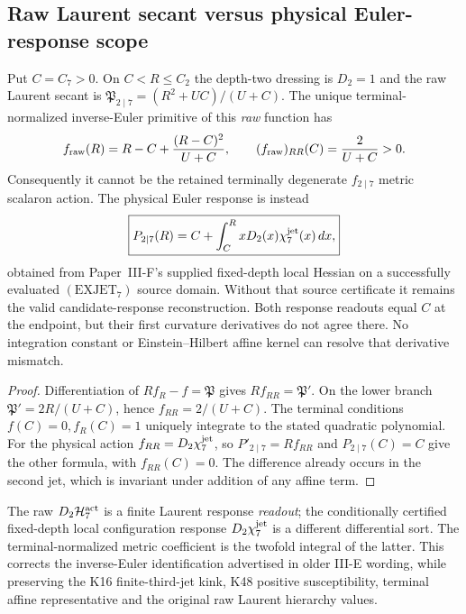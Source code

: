 \documentclass[12pt,a4paper]{article}
\begin{document}
\subsection{Raw Laurent secant versus physical Euler-response scope}
\label{p3e:sec:v1107-raw-euler-distinction}
\begin{proposition}
\label{p3e:prop:v1107-raw-not-physical-euler}
Put \(C=C_7>0\).  On \(C<R\le C_2\) the depth-two dressing is
\(D_2=1\) and the raw Laurent secant is
\(\mathfrak P_{2\mid7}=(R^2+UC)/(U+C)\).  The unique
terminal-normalized inverse-Euler primitive of this \emph{raw} function
has
\[
 f_{\rm raw}(R)=R-C+\frac{(R-C)^2}{U+C},\qquad
 (f_{\rm raw})_{RR}(C)=\frac{2}{U+C}>0.
\]
Consequently it cannot be the retained terminally degenerate
\(f_{2\mid7}\) metric scalaron action.  The physical Euler response is
instead
\[
 \boxed{P_{2\mid7}(R)=C+\int_C^R xD_2(x)\chi_7^{\rm jet}(x)\,dx,}
\]
obtained from Paper~III-F's supplied fixed-depth local Hessian on a successfully
evaluated $(\mathrm{EXJET}_7)$ source domain. Without that source
certificate it remains the valid candidate-response reconstruction.
Both response readouts equal \(C\) at the endpoint, but their first
curvature derivatives do not agree there.  No integration constant or
Einstein--Hilbert affine kernel can resolve that derivative mismatch.
\end{proposition}
\begin{proof}
Differentiation of \(Rf_R-f=\mathfrak P\) gives
\(Rf_{RR}=\mathfrak P'\).  On the lower branch
\(\mathfrak P'=2R/(U+C)\), hence \(f_{RR}=2/(U+C)\).
The terminal conditions \(f(C)=0,f_R(C)=1\) uniquely integrate to the
stated quadratic polynomial.  For the physical action
\(f_{RR}=D_2\chi_7^{\rm jet}\), so
\(P'_{2\mid7}=Rf_{RR}\) and \(P_{2\mid7}(C)=C\) give the other
formula, with \(f_{RR}(C)=0\).  The difference already occurs in the
second jet, which is invariant under addition of any affine term.
\end{proof}
\begin{remark}
The raw \(D_2\mathcal H_7^{\rm act}\) is a finite Laurent response
\emph{readout}; the conditionally certified fixed-depth local configuration response
\(D_2\chi_7^{\rm jet}\) is a different differential sort.  The
terminal-normalized metric coefficient is the twofold integral of the
latter.  This corrects the inverse-Euler identification advertised in
older III-E wording, while preserving the K16 finite-third-jet kink,
K48 positive susceptibility, terminal affine representative and the
original raw Laurent hierarchy values.
\end{remark}
\end{document}
